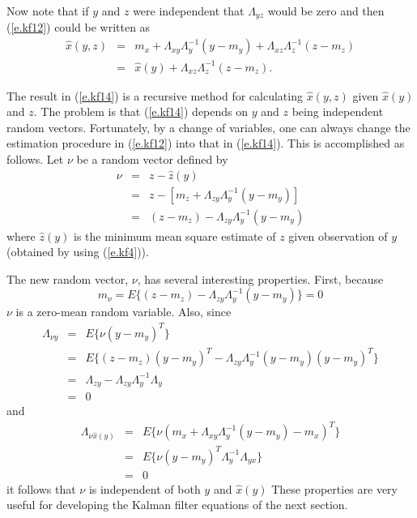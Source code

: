 %
Now note that if $y$ and $z$ were independent that
$\Lambda_{yz}$ would be zero and then (\ref{e.kf12}) could be written
as
%
\begin{eqnarray}
\hat{x}(y,z)&=&m_x+\Lambda_{xy}\Lambda_y^{-1}(y-m_y)+\Lambda_{xz}
\Lambda_z^{-1}(z-m_z)\nonumber\\
&=&\hat{x}(y)+\Lambda_{xz}\Lambda_z^{-1}(z-m_z).
\label{e.kf14}
\end{eqnarray}
%

	The result in (\ref{e.kf14}) is a recursive method for calculating
$\hat{x}(y,z)$ given $\hat{x}(y)$ and $z$.  The problem is that (\ref{e.kf14})
depends on $y$ and $z$ being independent random vectors.
Fortunately, by a change of variables, one can always change the
estimation procedure in (\ref{e.kf12}) into that in (\ref{e.kf14}).
This is accomplished as follows.  Let $\nu$ be a random vector
defined by
%
\begin{eqnarray}
\nu&=&z-\hat{z}(y)\nonumber\\
   &=&z-[m_z+\Lambda_{zy}\Lambda_y^{-1}(y-m_y)]\nonumber\\
   &=&(z-m_z)-\Lambda_{zy}\Lambda_y^{-1}(y-m_y)
\label{e.kf15}
\end{eqnarray}
%
where $\hat{z}(y)$ is the minimum mean square estimate of $z$
given observation of $y$ (obtained by using (\ref{e.kf4})).

	The new random vector, $\nu$, has several interesting
properties.  First, because
%
\begin{equation}
m_{\nu}=E\{(z-m_z)-\Lambda_{zy}\Lambda_y^{-1}(y-m_y)\}=0
\label{e.kf16}
\end{equation}
%
$\nu$ is a zero-mean random variable.  Also, since
%
\begin{eqnarray}
\Lambda_{\nu y}&=&E\{\nu(y-m_y)^T\}\nonumber\\
   &=&E\{(z-m_z)(y-m_y)^T
            -\Lambda_{zy}\Lambda_y^{-1}(y-m_y)(y-m_y)^T\}\nonumber\\
   &=&\Lambda_{zy}-\Lambda_{zy}\Lambda_y^{-1}\Lambda_y\nonumber\\
   &=&0
\label{e.kf17}
\end{eqnarray}
%
and
%
\begin{eqnarray}
\Lambda_{\nu \hat{x}(y)}&=&
            E\{\nu(m_x+\Lambda_{xy}\Lambda_y^{-1}(y-m_y)-m_x)^T\}\nonumber\\
   &=&E\{\nu(y-m_y)^T\Lambda_y^{-1}\Lambda_{yx}\}\nonumber\\
   &=&0
\label{e.kf18}
\end{eqnarray}
%
it follows that $\nu$ is independent of both $y$ and $\hat{x}(y)$
These properties
are very useful for developing the Kalman filter equations of the 
next section.

